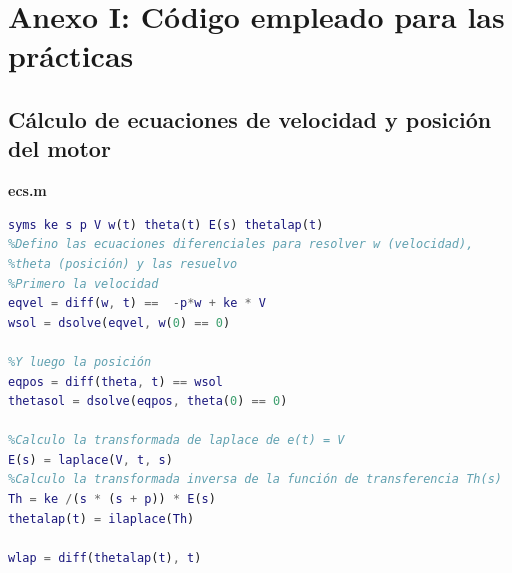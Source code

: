 \documentclass[a4paper, 12pt]{article}
\begin{document}
\newpage



\section*{Anexo I: Código empleado para las prácticas}
\subsection*{Cálculo de ecuaciones de velocidad y posición del motor}
\textbf{ecs.m}
\begin{lstlisting}[language = Matlab]
syms ke s p V w(t) theta(t) E(s) thetalap(t)
%Defino las ecuaciones diferenciales para resolver w (velocidad),
%theta (posición) y las resuelvo 
%Primero la velocidad
eqvel = diff(w, t) ==  -p*w + ke * V
wsol = dsolve(eqvel, w(0) == 0)

%Y luego la posición
eqpos = diff(theta, t) == wsol 
thetasol = dsolve(eqpos, theta(0) == 0) 

%Calculo la transformada de laplace de e(t) = V
E(s) = laplace(V, t, s) 
%Calculo la transformada inversa de la función de transferencia Th(s)
Th = ke /(s * (s + p)) * E(s) 
thetalap(t) = ilaplace(Th)

wlap = diff(thetalap(t), t)
\end{lstlisting}
\end{document}
